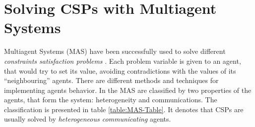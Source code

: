 \documentclass[../header]{subfiles}
\begin{document}
\providecommand{\rootdir}{..}



\section{Solving CSPs with Multiagent Systems}
\label{sec:CSP-Agents}

Multiagent Systems (MAS) have been successfully used to solve
different \emph{constraints satisfaction problems} \cite{MAS, MAS-Survey}.
Each problem variable is given to an agent, that would try to set its value,
avoiding contradictions with the values of its ``neighbouring'' agents.
There are different methods and techniques for implementing agents behavior.
In \cite{MAS-Survey} the MAS are classified by two properties of the agents,
that form the system: heterogeneity and communications.
The classification is presented in table \ref{table:MAS-Table}. It denotes
that CSPs are usually solved by \emph{heterogeneous communicating} agents.
\end{document}
